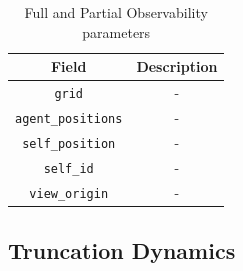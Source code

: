 \documentclass{scrartcl}
\theoremstyle{mytheoremstyle}
\theoremstyle{mytheoremstyle}
\theoremstyle{myproblemstyle}
\begin{document}
\begin{table}[H]
    \centering
    \begin{tabular}{|c|c|}
        \hline
        \textbf{Field}            & \textbf{Description} \\
        \hline
        \texttt{grid}             & -                    \\
        \hline
        \texttt{agent\_positions} & -                    \\
        \hline
        \texttt{self\_position}   & -                    \\
        \hline
        \texttt{self\_id}         & -                    \\
        \hline
        \texttt{view\_origin}     & -                    \\
        \hline
    \end{tabular}
    \caption{Full and Partial Observability parameters}
    \label{tab:obs}
\end{table}





\subsection{Truncation Dynamics}
\end{document}
